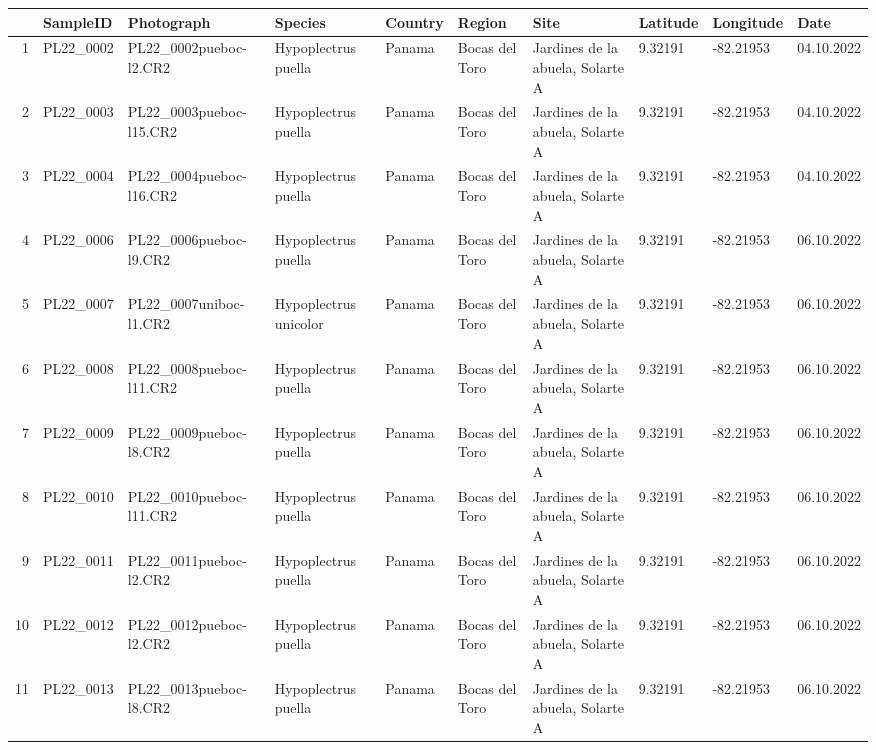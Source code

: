 \begin{table}[ht]
\centering
\begin{tabular}{rlllllllll}
  \hline
 & SampleID & Photograph & Species & Country & Region & Site & Latitude & Longitude & Date \\ 
  \hline
1 & PL22\_0002 & PL22\_0002pueboc-l2.CR2 & Hypoplectrus puella & Panama & Bocas del Toro & Jardines de la abuela, Solarte A & 9.32191 & -82.21953 & 04.10.2022 \\ 
  2 & PL22\_0003 & PL22\_0003pueboc-l15.CR2 & Hypoplectrus puella & Panama & Bocas del Toro & Jardines de la abuela, Solarte A & 9.32191 & -82.21953 & 04.10.2022 \\ 
  3 & PL22\_0004 & PL22\_0004pueboc-l16.CR2 & Hypoplectrus puella & Panama & Bocas del Toro & Jardines de la abuela, Solarte A & 9.32191 & -82.21953 & 04.10.2022 \\ 
  4 & PL22\_0006 & PL22\_0006pueboc-l9.CR2 & Hypoplectrus puella & Panama & Bocas del Toro & Jardines de la abuela, Solarte A & 9.32191 & -82.21953 & 06.10.2022 \\ 
  5 & PL22\_0007 & PL22\_0007uniboc-l1.CR2 & Hypoplectrus unicolor & Panama & Bocas del Toro & Jardines de la abuela, Solarte A & 9.32191 & -82.21953 & 06.10.2022 \\ 
  6 & PL22\_0008 & PL22\_0008pueboc-l11.CR2 & Hypoplectrus puella & Panama & Bocas del Toro & Jardines de la abuela, Solarte A & 9.32191 & -82.21953 & 06.10.2022 \\ 
  7 & PL22\_0009 & PL22\_0009pueboc-l8.CR2 & Hypoplectrus puella & Panama & Bocas del Toro & Jardines de la abuela, Solarte A & 9.32191 & -82.21953 & 06.10.2022 \\ 
  8 & PL22\_0010 & PL22\_0010pueboc-l11.CR2 & Hypoplectrus puella & Panama & Bocas del Toro & Jardines de la abuela, Solarte A & 9.32191 & -82.21953 & 06.10.2022 \\ 
  9 & PL22\_0011 & PL22\_0011pueboc-l2.CR2 & Hypoplectrus puella & Panama & Bocas del Toro & Jardines de la abuela, Solarte A & 9.32191 & -82.21953 & 06.10.2022 \\ 
  10 & PL22\_0012 & PL22\_0012pueboc-l2.CR2 & Hypoplectrus puella & Panama & Bocas del Toro & Jardines de la abuela, Solarte A & 9.32191 & -82.21953 & 06.10.2022 \\ 
  11 & PL22\_0013 & PL22\_0013pueboc-l8.CR2 & Hypoplectrus puella & Panama & Bocas del Toro & Jardines de la abuela, Solarte A & 9.32191 & -82.21953 & 06.10.2022 \\ 

\end{tabular}
\end{table}
